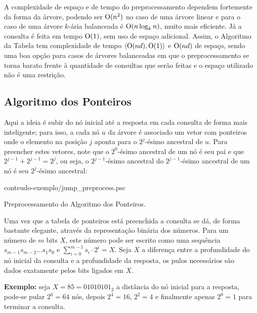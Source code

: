 A complexidade de espaço e de tempo do preprocessamento dependem fortemente da forma da
árvore, podendo ser $\mathrm{O}(n^2)$ no caso de uma árvore linear e para o caso de uma
árvore $k$-ária balanceada é $\mathrm{O}(n \log_k n)$, muito mais eficiente. Já a consulta
é feita em tempo $\mathrm{O}(1)$, sem uso de espaço adicional. Assim, o Algoritmo da Tabela
tem complexidade de tempo $\langle \mathrm{O}(nd), \mathrm{O}(1) \rangle$ e $\mathrm{O}(nd)$ de espaço,
sendo uma boa opção para casos de árvores balanceadas em que o preprocessamento se torna
barato frente à quantidade de consultas que serão feitas e o espaço utilizado não é
uma restrição.


\subsection{Algoritmo dos Ponteiros}
Aqui a ideia é subir do nó inicial até a resposta em cada consulta de forma mais
inteligente; para isso, a cada nó $u$ da árvore é associado um vetor com ponteiros onde o elemento na
posição $j$ aponta para o $2^j$-ésimo ancestral de $u$. Para preencher estes
vetores, note que o $2^0$-ésimo ancestral de um nó é seu pai e que
$2^{j-1} + 2^{j-1} = 2^j$, ou seja, o $2^{j-1}$-ésimo ancestral do $2^{j-1}$-ésimo
ancestral de um nó é seu $2^j$-ésimo ancestral:

\begin{program}[H]
  
  {conteudo-exemplo/jump_preprocess.psc}
  \caption{Preprocessamento do Algoritmo dos Ponteiros.\label{prog:jumpproc}}
\end{program}

Uma vez que a tabela de ponteiros está preenchida a consulta se dá, de forma bastante
elegante, através da representação binária dos números. Para um número de $m$ bits
$X$, este número pode ser escrito como uma sequência $s_{m-1} s_{m-2} \ldots s_{1} s_{0}$ e
$\sum_{i=0}^{m-1} s_i \cdot 2^i = X$. Seja $X$ a diferença entre a profundidade do nó
inicial da consulta e a profundidade da resposta, os pulos necessários são dados
exatamente pelos bits ligados em $X$.

\textbf{Exemplo:} seja $X = 85 = 01010101_2$ a distância do nó inicial para a resposta,
pode-se pular $2^6 = 64$ nós, depois $2^4 = 16$, $2^2 = 4$ e finalmente apenas $2^0 = 1$
para terminar a consulta.

